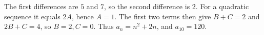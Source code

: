 The first differences are $5$ and $7$, so the second difference is $2$. For a quadratic sequence it equals $2A$, hence $A=1$. The first two terms then give $B+C=2$ and $2B+C=4$, so $B=2,C=0$. Thus $a_n=n^2+2n$, and $\boxed{a_{10}=120}$.
